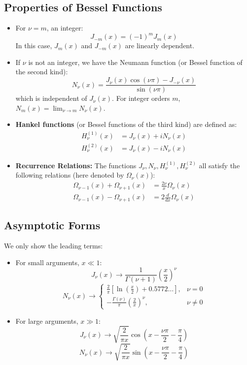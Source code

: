 \documentclass{article}
\begin{document}
	\subsection*{Properties of Bessel Functions}
	\begin{itemize}
		\item For $\nu = m$, an integer:
		$$ J_{-m}(x) = (-1)^m J_m(x) $$
		In this case, $J_m(x)$ and $J_{-m}(x)$ are linearly dependent.
		
		\item If $\nu$ is not an integer, we have the Neumann function (or Bessel function of the second kind):
		$$ N_\nu(x) = \frac{J_\nu(x) \cos(\nu\pi) - J_{-\nu}(x)}{\sin(\nu\pi)} $$
		which is independent of $J_\nu(x)$. For integer orders $m$, $N_m(x) = \lim_{\nu \to m} N_\nu(x)$.
		
		\item \textbf{Hankel functions} (or Bessel functions of the third kind) are defined as:
		\begin{align*}
			H_\nu^{(1)}(x) &= J_\nu(x) + i N_\nu(x) \\
			H_\nu^{(2)}(x) &= J_\nu(x) - i N_\nu(x)
		\end{align*}
		
		\item \textbf{Recurrence Relations:} The functions $J_\nu, N_\nu, H_\nu^{(1)}, H_\nu^{(2)}$ all satisfy the following relations (here denoted by $\Omega_\nu(x)$):
		\begin{align*}
			\Omega_{\nu-1}(x) + \Omega_{\nu+1}(x) &= \frac{2\nu}{x} \Omega_\nu(x) \\
			\Omega_{\nu-1}(x) - \Omega_{\nu+1}(x) &= 2 \frac{d}{dx} \Omega_\nu(x)
		\end{align*}
	\end{itemize}
	
	\subsection*{Asymptotic Forms}
	We only show the leading terms:
	\begin{itemize}
		\item For small arguments, $x \ll 1$:
		$$ J_\nu(x) \to \frac{1}{\Gamma(\nu+1)} \left(\frac{x}{2}\right)^\nu $$
		$$ N_\nu(x) \to 
		\begin{cases}
			\frac{2}{\pi} \left[ \ln\left(\frac{x}{2}\right) + 0.5772\dots \right], & \nu=0 \\
			-\frac{\Gamma(\nu)}{\pi} \left(\frac{2}{x}\right)^\nu, & \nu \neq 0
		\end{cases}
		$$
		
		\item For large arguments, $x \gg 1$:
		$$ J_\nu(x) \to \sqrt{\frac{2}{\pi x}} \cos\left(x - \frac{\nu\pi}{2} - \frac{\pi}{4}\right) $$
		$$ N_\nu(x) \to \sqrt{\frac{2}{\pi x}} \sin\left(x - \frac{\nu\pi}{2} - \frac{\pi}{4}\right) $$
	\end{itemize}
	
\end{document}
